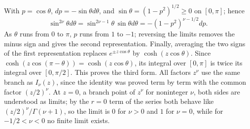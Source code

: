 With $p=\cos\theta$, $dp=-\sin\theta d\theta$, and
$\sin\theta=(1-p^2)^{1/2}\ge0$ on $[0,\pi]$; hence
\[
\sin^{2\nu}\theta d\theta=\sin^{2\nu-1}\theta\,\sin\theta d\theta
=-(1-p^2)^{\nu-1/2}dp.
\]
As $\theta$ runs from $0$ to $\pi$, $p$ runs from $1$ to $-1$;
reversing the limits removes the minus sign and gives the second
representation. Finally, averaging the two signs of the first
representation replaces $e^{\pm z\cos\theta}$ by
$\cosh(z\cos\theta)$. Since $\cosh(z\cos(\pi-\theta))
=\cosh(z\cos\theta)$, its integral over $[0,\pi]$ is twice its
integral over $[0,\pi/2]$. This proves the third form.
All factors $z^\nu$ use the same branch as $I_\nu(z)$, since the
identity was proved term by term with the common factor
$(z/2)^\nu$. At $z=0$, a branch point of $z^\nu$ for noninteger
$\nu$, both sides are understood as limits; by the $r=0$ term of
the series both behave like $(z/2)^\nu/\Gamma(\nu+1)$, so the limit
is $0$ for $\nu>0$ and $1$ for $\nu=0$, while for $-1/2<\nu<0$ no
finite limit exists.


